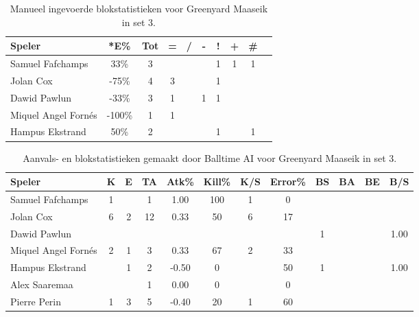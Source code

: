 \begin{table}[ht!]
    \centering
    \scriptsize
    \begin{tabular}{|l|c|c|c|c|c|c|c|c|c|} \hline
        \textbf{Speler} & *E\% & Tot & = & / & - & ! & + & \#\\ \hline
        Samuel Fafchamps & 33\% & 3 &  &  &  & 1 & 1 & 1 \\ 
        Jolan Cox & -75\% & 4 & 3 &  &  & 1 &  & \\ 
        Dawid Pawlun & -33\% & 3 & 1 &  & 1 & 1 &  &  \\ 
        Miquel Angel Fornés & -100\% & 1 & 1 &  &  &  &  & \\ 
        Hampus Ekstrand & 50\% & 2 &  &  &  & 1 &  & 1 \\  \hline
    \end{tabular}
    \caption[Manueel ingevoerde blokstatistieken voor Greenyard Maaseik in set 3]{\label{tab:PL3BlockMaaseikMan3}Manueel ingevoerde blokstatistieken voor Greenyard Maaseik in set 3.}
\end{table}

\begin{table}[ht!]
  \centering
  \scriptsize
  \begin{tabular}{|l|c|c|c|c|c|c|c|c|c|c|c|} \hline
    \textbf{Speler} & K & E & TA & Atk\% & Kill\% & K/S & Error\% & BS & BA & BE & B/S \\ \hline
    Samuel Fafchamps & 1 &  & 1 & 1.00 & 100 & 1 & 0 &  &   &  &  \\
    Jolan Cox & 6 & 2 & 12 & 0.33 & 50 & 6 & 17 &  &   &   & \\
    Dawid Pawlun &   &   &   &   &   &   &   & 1 & & & 1.00 \\
    Miquel Angel Fornés & 2 & 1 & 3 & 0.33 & 67 & 2 & 33 &  &   &  & \\
    Hampus Ekstrand &  & 1 & 2 & -0.50 & 0 &  & 50 & 1 & & & 1.00 \\
    Alex Saaremaa &  &  & 1 & 0.00 & 0 &  & 0 &  & & & \\
    Pierre Perin & 1 & 3 & 5 & -0.40 & 20 & 1 & 60 & &  & &  \\  \hline
  \end{tabular}
  \caption[Aanvals- en blokstatistieken gemaakt door Balltime AI voor Greenyard Maaseik in set 3]{\label{tab:PL3AttBlockMaaseikAI3}Aanvals- en blokstatistieken gemaakt door Balltime AI voor Greenyard Maaseik in set 3.}
\end{table}
